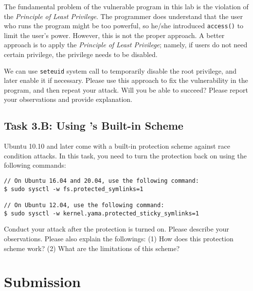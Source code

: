 The fundamental problem of the vulnerable program in this lab is 
the violation of the {\em Principle of Least Privilege}. 
The programmer does understand that the user who runs the program 
might be too powerful, so he/she introduced {\tt access()} to limit the user's 
power. However, this is not the proper approach. A better
approach is to apply the {\em Principle of Least Privilege}; 
namely, if users do not need certain privilege, the privilege
needs to be disabled.

We can use {\tt seteuid{}} system call to temporarily disable
the root privilege, and later enable it if necessary. Please use 
this approach to fix the vulnerability in the program, and then
repeat your attack. Will you be able to succeed? Please report your
observations and provide explanation.



\subsection{Task 3.B: Using \ubuntu's Built-in Scheme}

Ubuntu 10.10 and later come with a built-in protection scheme against race condition
attacks. In this task, you need to turn the protection back on using the
following commands:

\begin{lstlisting}
// On Ubuntu 16.04 and 20.04, use the following command:
$ sudo sysctl -w fs.protected_symlinks=1

// On Ubuntu 12.04, use the following command:
$ sudo sysctl -w kernel.yama.protected_sticky_symlinks=1
\end{lstlisting}

Conduct your attack after the protection is turned on.  
Please describe your observations. Please also explain
the followings: (1) How does this protection scheme work?
(2) What are the limitations of this scheme?






\section{Submission}





